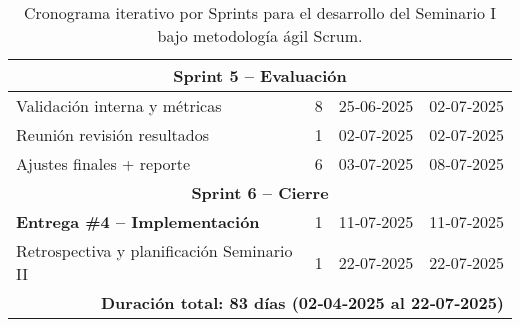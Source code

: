 \begin{table}[H]
\begin{tabularx}{\textwidth}{|X|c|c|c|}
\multicolumn{4}{|c|}{\textbf{Sprint 5 – Evaluación}} \\\hline
Validación interna y métricas & 8 & 25‑06‑2025 & 02‑07‑2025 \\
Reunión revisión resultados & 1 & 02‑07‑2025 & 02‑07‑2025 \\
Ajustes finales + reporte & 6 & 03‑07‑2025 & 08‑07‑2025 \\\hline

\multicolumn{4}{|c|}{\textbf{Sprint 6 – Cierre}} \\\hline
\textbf{Entrega \#4 – Implementación} & 1 & 11‑07‑2025 & 11‑07‑2025 \\
Retrospectiva y planificación Seminario II & 1 & 22‑07‑2025 & 22‑07‑2025 \\\hline
\multicolumn{4}{|r|}{\textbf{Duración total: 83 días (02‑04‑2025 al 22‑07‑2025)}} \\\hline
\end{tabularx}
\caption{Cronograma iterativo por Sprints para el desarrollo del Seminario I bajo metodología ágil Scrum.}
\label{tbl:cronograma_scrum}
\end{table}


